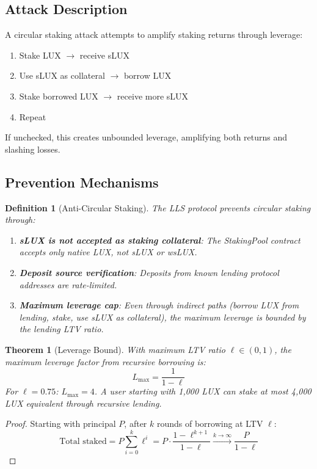 \documentclass[11pt,a4paper]{article}
\newtheorem{theorem}{Theorem}
\newtheorem{definition}{Definition}
\begin{document}
\subsection{Attack Description}

A circular staking attack attempts to amplify staking returns through leverage:
\begin{enumerate}
    \item Stake LUX $\to$ receive sLUX
    \item Use sLUX as collateral $\to$ borrow LUX
    \item Stake borrowed LUX $\to$ receive more sLUX
    \item Repeat
\end{enumerate}

If unchecked, this creates unbounded leverage, amplifying both returns and slashing losses.

\subsection{Prevention Mechanisms}

\begin{definition}[Anti-Circular Staking]
The LLS protocol prevents circular staking through:
\begin{enumerate}
    \item \textbf{sLUX is not accepted as staking collateral}: The StakingPool contract accepts only native LUX, not sLUX or wsLUX.
    \item \textbf{Deposit source verification}: Deposits from known lending protocol addresses are rate-limited.
    \item \textbf{Maximum leverage cap}: Even through indirect paths (borrow LUX from lending, stake, use sLUX as collateral), the maximum leverage is bounded by the lending LTV ratio.
\end{enumerate}
\end{definition}

\begin{theorem}[Leverage Bound]
With maximum LTV ratio $\ell \in (0, 1)$, the maximum leverage factor from recursive borrowing is:
\begin{equation}
    L_{\max} = \frac{1}{1 - \ell}
\end{equation}
For $\ell = 0.75$: $L_{\max} = 4$. A user starting with 1,000 LUX can stake at most 4,000 LUX equivalent through recursive lending.
\end{theorem}

\begin{proof}
Starting with principal $P$, after $k$ rounds of borrowing at LTV $\ell$:
\begin{equation}
    \text{Total staked} = P \sum_{i=0}^{k} \ell^i = P \cdot \frac{1 - \ell^{k+1}}{1 - \ell} \xrightarrow{k \to \infty} \frac{P}{1 - \ell}
\end{equation}
\end{proof}
\end{document}

